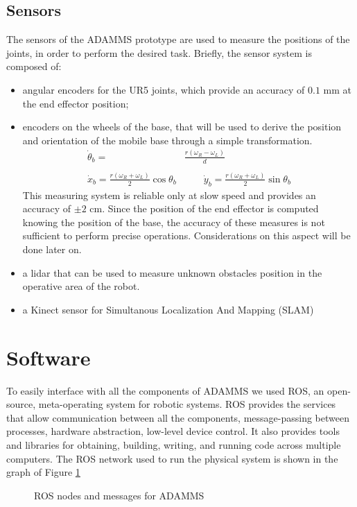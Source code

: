 \subsection{Sensors}
The sensors of the ADAMMS prototype are used to measure the positions of the joints, in order to perform the desired task. Briefly, the sensor system is composed of:
\begin{itemize}
\item angular encoders for the UR5 joints, which provide an accuracy of $0.1$ mm at the end effector position;
\item encoders on the wheels of the base, that will be used to derive the position and orientation of the mobile base through a simple transformation.
\begin{equation*}
\begin{split}
\dot{\theta}_b=&\frac{r(\omega_R-\omega_L)}{d} \\\\ \dot{x}_b=\frac{r(\omega_R+\omega_L)}{2}\cos\theta_b &\qquad \dot{y}_b=\frac{r(\omega_R+\omega_L)}{2}\sin\theta_b
\end{split}
\end{equation*}
This measuring system is reliable only at slow speed and provides an accuracy of $\pm 2$ cm. Since the position of the end effector is computed knowing the position of the base, the accuracy of these measures is not sufficient to perform precise operations. Considerations on this aspect will be done later on.
\item a lidar that can be used to measure unknown obstacles position in the operative area of the robot.
\item a Kinect sensor for Simultanous Localization And Mapping (SLAM)
\end{itemize}

\section{Software}

To easily interface with all the components of ADAMMS we used ROS, an open-source, meta-operating system for robotic systems. ROS provides the services that allow communication between all the components, message-passing between processes, hardware abstraction, low-level device control. It also provides tools and libraries for obtaining, building, writing, and running code across multiple computers. The ROS network used to run the physical system is shown in the graph of Figure \ref{ROSnodes}
\begin{figure}[h!]

\centering

\caption{ROS nodes and messages for ADAMMS}
\label{ROSnodes} 
\end{figure}

